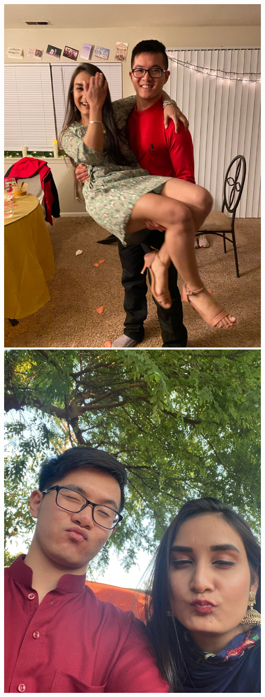 \documentclass[
]{book}
\begin{document}
\includegraphics[width=5.20833in,height=\textheight]{mimages/7 2-16-2021.jpg}
\includegraphics[width=5.20833in,height=\textheight]{mimages/8.2 4-23-2021.jpg}
\end{document}
